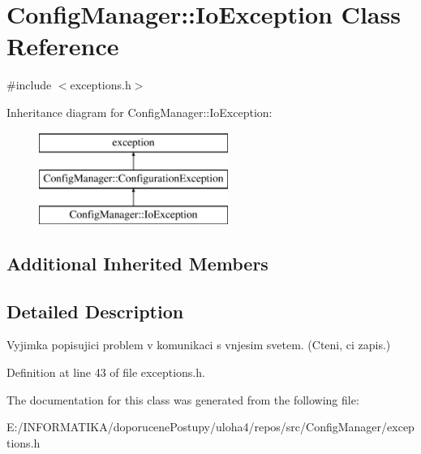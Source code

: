 \hypertarget{class_config_manager_1_1_io_exception}{}\section{Config\+Manager\+:\+:Io\+Exception Class Reference}
\label{class_config_manager_1_1_io_exception}


{\ttfamily \#include $<$exceptions.\+h$>$}

Inheritance diagram for Config\+Manager\+:\+:Io\+Exception\+:\begin{figure}[H]
\begin{center}
\leavevmode
\includegraphics[height=3.000000cm]{class_config_manager_1_1_io_exception}
\end{center}
\end{figure}
\subsection*{Additional Inherited Members}


\subsection{Detailed Description}
Vyjimka popisujici problem v komunikaci s vnjesim svetem. (Cteni, ci zapis.) 

Definition at line 43 of file exceptions.\+h.



The documentation for this class was generated from the following file\+:\begin{DoxyCompactItemize}
\item 
E\+:/\+I\+N\+F\+O\+R\+M\+A\+T\+I\+K\+A/doporucene\+Postupy/uloha4/repos/src/\+Config\+Manager/exceptions.\+h\end{DoxyCompactItemize}
